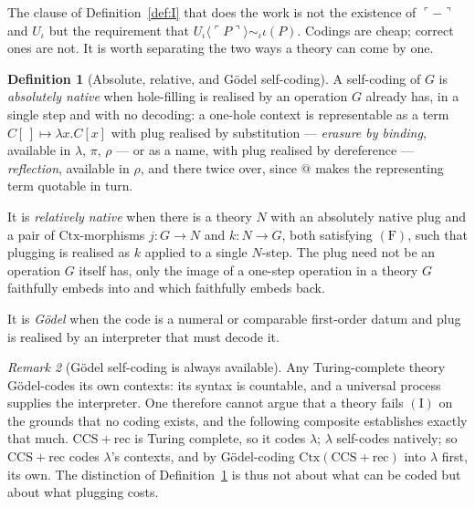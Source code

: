 \documentclass[11pt,a4paper]{article}
\theoremstyle{definition}
\newtheorem{definition}{Definition}[section]
\theoremstyle{plain}
\theoremstyle{remark}
\newtheorem{remark}[definition]{Remark}
\newcommand{\CtxC}{\mathrm{Ctx}}
\newcommand{\rhoc}{\rho}
\newcommand{\CCSrec}{\mathrm{CCS}{+}\mathrm{rec}}
\newcommand{\Fcond}{(\mathrm{F})}
\newcommand{\Icond}{(\mathrm{I})}
\begin{document}
The clause of Definition~\ref{def:I} that does the work is not the existence of
$\ulcorner - \urcorner$ and $U_\iota$ but the requirement that
$U_\iota\langle \ulcorner P \urcorner \rangle \sim_\iota \iota(P)$. Codings are cheap; correct ones
are not. It is worth separating the two ways a theory can come by one.

\begin{definition}[Absolute, relative, and Gödel self-coding]
\label{def:native}
A self-coding of $G$ is \emph{absolutely native} when hole-filling is realised by an operation $G$
already has, in a single step and with no decoding: a one-hole context is representable as a term
$C[\,] \mapsto \lambda x.C[x]$ with plug realised by substitution --- \emph{erasure by binding},
available in $\lambda$, $\pi$, $\rhoc$ --- or as a name, with plug realised by dereference ---
\emph{reflection}, available in $\rhoc$, and there twice over, since $@$ makes the representing term
quotable in turn.

It is \emph{relatively native} when there is a theory $N$ with an absolutely native plug and a pair of
$\CtxC$-morphisms $j : G \to N$ and $k : N \to G$, both satisfying $\Fcond$, such that plugging is
realised as $k$ applied to a single $N$-step. The plug need not be an operation $G$ itself has, only
the image of a one-step operation in a theory $G$ faithfully embeds into and which faithfully embeds
back.

It is \emph{Gödel} when the code is a numeral or comparable first-order datum and plug is realised by
an interpreter that must decode it.
\end{definition}

\begin{remark}[Gödel self-coding is always available]
\label{rmk:godel-always}
Any Turing-complete theory Gödel-codes its own contexts: its syntax is countable, and a universal
process supplies the interpreter. One therefore cannot argue that a theory fails $\Icond$ on the
grounds that no coding exists, and the following composite establishes exactly that much. $\CCSrec$
is Turing complete, so it codes $\lambda$; $\lambda$ self-codes natively; so $\CCSrec$ codes
$\lambda$'s contexts, and by Gödel-coding $\CtxC(\CCSrec)$ into $\lambda$ first, its own. The
distinction of Definition~\ref{def:native} is thus not about what can be coded but about what
plugging costs.
\end{remark}
\end{document}
